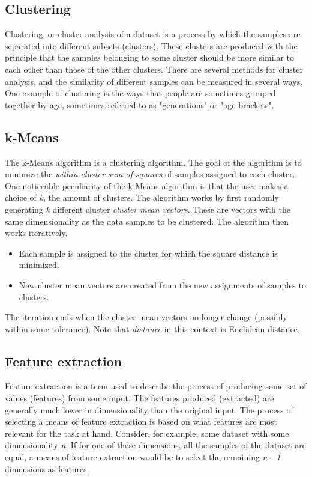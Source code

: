 \documentclass{article}
\begin{document}
\subsection{Clustering}
Clustering, or cluster analysis of a dataset is a process by which the samples are separated into different subsets (clusters). These clusters are produced with the principle that the samples belonging to some cluster should be more similar to each other than those of the other clusters. There are several methods for cluster analysis, and the similarity of different samples can be measured in several ways. One example of clustering is the ways that people are sometimes grouped together by age, sometimes referred to as "generations" or "age brackets".

\subsection{k-Means}
The k-Means algorithm is a clustering algorithm. The goal of the algorithm is to minimize the \textit{within-cluster sum of squares} of samples assigned to each cluster. One noticeable peculiarity of the k-Means algorithm is that the user makes a choice of \textit{k}, the amount of clusters. The algorithm works by first randomly generating \textit{k} different cluster \textit{cluster mean vectors}. These are vectors with the same dimensionality as the data samples to be clustered. The algorithm then works iteratively. \citep[p258-260]{PractStats}
\begin{itemize}
    \item Each sample is assigned to the cluster for which the square distance is minimized.
    \item New cluster mean vectors are created from the new assignments of samples to clusters.
\end{itemize}
The iteration ends when the cluster mean vectors no longer change (possibly within some tolerance). Note that \textit{distance} in this context is Euclidean distance.

\subsection{Feature extraction}
Feature extraction is a term used to describe the process of producing some set of values (features) from some input. The features produced (extracted) are generally much lower in dimensionality than the original input. The process of selecting a means of feature extraction is based on what features are most relevant for the task at hand. Consider, for example, some dataset with some dimensionality \textit{n}. If for one of these dimensions, all the samples of the dataset are equal, a means of feature extraction would be to select the remaining \textit{n - 1} dimensions as features.
\end{document}
